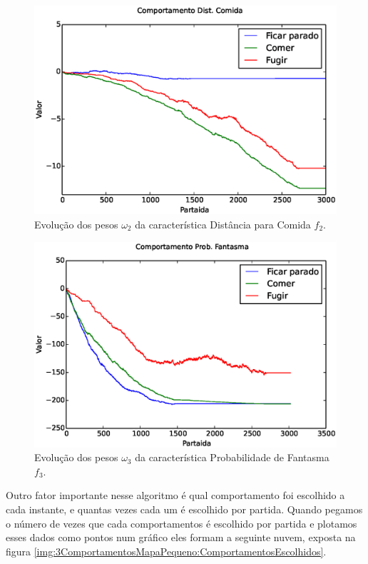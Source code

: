 \begin{figure}[H]
    \centering
    \includegraphics[width=\linewidth]{images/3_behaviors_small_map/weights____pol__DistComida}
    \caption{Evolução dos pesos $ \omega_2 $ da característica Distância para Comida $ f_2 $.}
    \label{img:3ComportamentosMapaPequeno:PesoDistComida}
\end{figure}

\begin{figure}[H]
    \centering
    \includegraphics[width=\linewidth]{images/3_behaviors_small_map/weights____pol__ProbFantasma}
    \caption{Evolução dos pesos $ \omega_3 $ da característica Probabilidade de Fantasma $ f_3 $.}
    \label{img:3ComportamentosMapaPequeno:PesoProbFantasma}
\end{figure}


Outro fator importante nesse algoritmo é qual comportamento foi escolhido a cada instante, e quantas vezes cada um é escolhido por partida. Quando pegamos o número de vezes que cada comportamentos é escolhido por partida e plotamos esses dados como pontos num gráfico eles formam a seguinte nuvem, exposta na figura \ref{img:3ComportamentosMapaPequeno:ComportamentosEscolhidos}.

